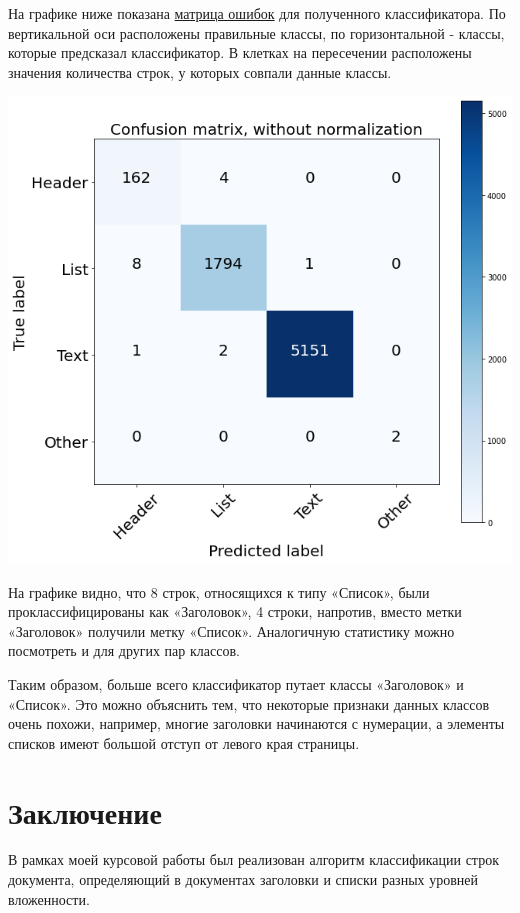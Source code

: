 \documentclass[a4paper,12pt]{article}
\begin{document}
 На графике ниже показана \href{https://en.wikipedia.org/wiki/Confusion_matrix}{матрица ошибок} для полученного классификатора. По вертикальной оси расположены правильные классы, по горизонтальной - классы, которые предсказал классификатор. В клетках на пересечении расположены значения количества строк, у которых совпали данные классы.

\begin{center}
	\includegraphics[width=1.0\textwidth]{pics/conf_matrix.png}
\end{center}

На графике видно, что 8 строк, относящихся к типу «Список», были проклассифицированы как «Заголовок», 4 строки, напротив, вместо метки «Заголовок» получили метку «Список». Аналогичную статистику можно посмотреть и для других пар классов.

Таким образом, больше всего классификатор путает классы «Заголовок» и «Список». Это можно объяснить тем, что некоторые признаки данных классов очень похожи, например, многие заголовки начинаются с нумерации, а элементы списков имеют большой отступ от левого края страницы.

\newpage
\section*{Заключение}

В рамках моей курсовой работы был реализован алгоритм классификации строк документа, определяющий в документах заголовки и списки разных уровней вложенности.
\end{document}
